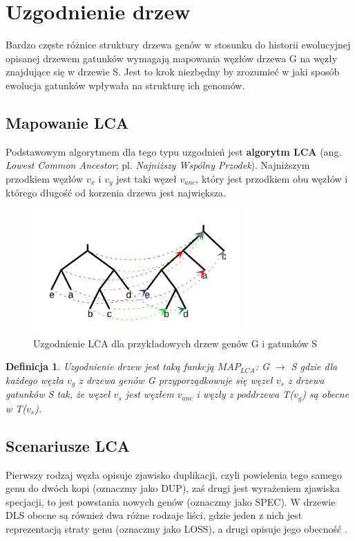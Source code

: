 \documentclass[licencjacka]{pracamgr}
\newtheorem{defi}{Definicja}[section]
\begin{document}
\section{Uzgodnienie drzew}
Bardzo częste różnice struktury drzewa genów w stosunku do historii ewolucyjnej opisanej drzewem gatunków wymagają mapowania węzłów drzewa G na węzły znajdujące się w drzewie S. Jest to krok niezbędny by zrozumieć w jaki sposób ewolucja gatunków wpływała na strukturę ich genomów. 

\subsection{Mapowanie LCA}
Podstawowym algorytmem dla tego typu uzgodnień jest \textbf{algorytm LCA} (ang. \textit{Lowest Common Ancestor}; pl. \textit{Najniższy Wspólny Przodek}). Najniższym przodkiem węzłów $v_x$ i $v_y$ jest taki węzeł $v_{anc}$, który jest przodkiem obu węzłów i którego długość od korzenia drzewa jest największa.

\begin{figure}[H]
  \centering
  \includegraphics[width=80mm]{./pictures/mapping.png}
  \caption{Uzgodnienie LCA dla przykładowych drzew genów G i gatunków S}
\end{figure}

\begin{defi}
Uzgodnienie drzew jest taką funkcją $MAP_{LCA}$: G $\rightarrow$ S gdzie dla każdego węzła $v_g$ z drzewa genów G przyporządkowuje się węzeł $v_s$ z drzewa gatunków S tak, że węzeł $v_s$ jest węzłem $v_{anc}$ i węzły z poddrzewa T($v_g$) są obecne w T($v_s$).
\end{defi}

\subsection{Scenariusze LCA}

Pierwszy rodzaj węzła opisuje zjawisko duplikacji, czyli powielenia tego samego genu do dwóch kopi (oznaczmy jako DUP), zaś drugi jest wyrażeniem zjawiska specjacji, to jest powstania nowych genów (oznaczmy jako SPEC). W drzewie DLS obecne są również dwa różne rodzaje liści, gdzie jeden z nich jest reprezentacją straty genu (oznaczmy jako LOSS), a drugi opisuje jego obecność \cite{doktorat_paszek}.
\end{document}
